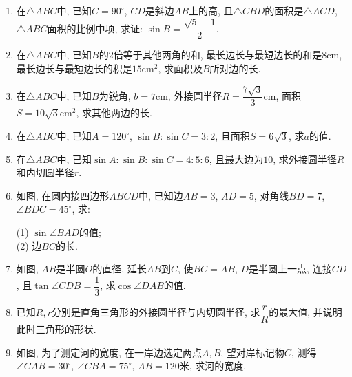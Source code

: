 \documentclass[10pt,a4paper]{article}
\begin{document}
\begin{enumerate}[1.]
\item 在$\triangle ABC$中, 已知$C=90^\circ$, $CD$是斜边$AB$上的高, 且$\triangle CBD$的面积是$\triangle ACD$, $\triangle ABC$面积的比例中项, 求证: $\sin B=\dfrac{\sqrt 5-1}2$.
\item 在$\triangle ABC$中, 已知$B$的$2$倍等于其他两角的和, 最长边长与最短边长的和是$8\text{cm}$, 最长边长与最短边长的积是$15\text{cm}^2$, 求面积及$B$所对边的长.
\item 在$\triangle ABC$中, 已知$B$为锐角, $b=7\text{cm}$, 外接圆半径$R=\dfrac{7\sqrt 3}3\text{cm}$, 面积$S=10\sqrt 3\text{cm}^2$, 求其他两边的长.
\item 在$\triangle ABC$中, 已知$A=120^\circ$, $\sin B:\sin C=3:2$, 且面积$S=6\sqrt 3$, 求$a$的值.
\item 在$\triangle ABC$中, 已知$\sin A:\sin B:\sin C=4:5:6$, 且最大边为$10$, 求外接圆半径$R$和内切圆半径$r$.
\item 如图, 在圆内接四边形$ABCD$中, 已知边$AB=3$, $AD=5$, 对角线$BD=7$, $\angle BDC=45^\circ$, 求:
\begin{center}
\end{center}
(1) $\sin \angle BAD$的值;\\
(2) 边$BC$的长.
\item 如图, $AB$是半圆$O$的直径, 延长$AB$到$C$, 使$BC=AB$, $D$是半圆上一点, 连接$CD$, 且$\tan \angle CDB=\dfrac 13$, 求$\cos \angle DAB$的值.
\begin{center}
\end{center}
\item 已知$R,r$分別是直角三角形的外接圆半径与内切圆半径, 求$\dfrac rR$的最大值, 并说明此时三角形的形状.
\item 如图, 为了测定河的宽度, 在一岸边选定两点$A,B$, 望对岸标记物$C$, 测得$\angle CAB=30^\circ$, $\angle CBA=75^\circ$, $AB=120$米, 求河的宽度.

\end{enumerate}
\end{document}
